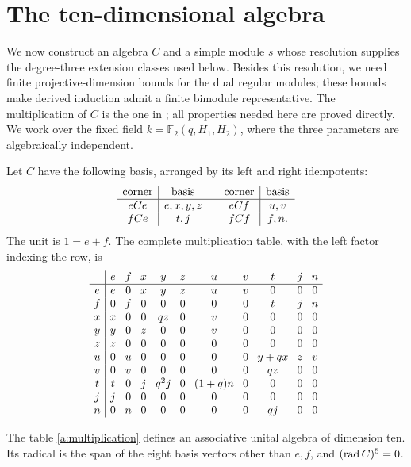 \section{The ten-dimensional algebra}
\label{a:section}

We now construct an algebra \(C\) and a simple module \(s\) whose
resolution supplies the degree-three extension classes used below.
Besides this resolution, we need
finite projective-dimension bounds for the dual regular modules;
these bounds make derived induction admit a finite bimodule
representative. The multiplication of $C$ is the one in
\cite[Section~4.1]{OpenAIAR2026}; all properties needed here are proved
directly.  We work over the fixed field
\(k=\mathbb F_2(q,H_1,H_2)\), where the three parameters are
algebraically independent.

Let \(C\) have the following basis, arranged by its left and right
idempotents:
\begin{equation}
\begin{array}{c|c@{\qquad}c|c}
\text{corner}&\text{basis}&\text{corner}&\text{basis}\\ \hline
eCe&e,x,y,z&eCf&u,v\\
fCe&t,j&fCf&f,n.
\end{array}
\label{a:corners}
\end{equation}
The unit is \(1=e+f\).  The complete multiplication table, with the
left factor indexing the row, is
\begin{equation}
\begingroup
\setlength{\arraycolsep}{4pt}
\begin{array}{c|cccccccccc}
 &e&f&x&y&z&u&v&t&j&n\\ \hline
e&e&0&x&y&z&u&v&0&0&0\\
f&0&f&0&0&0&0&0&t&j&n\\
x&x&0&0&qz&0&v&0&0&0&0\\
y&y&0&z&0&0&v&0&0&0&0\\
z&z&0&0&0&0&0&0&0&0&0\\
u&0&u&0&0&0&0&0&y+qx&z&v\\
v&0&v&0&0&0&0&0&qz&0&0\\
t&t&0&j&q^2j&0&(1+q)n&0&0&0&0\\
j&j&0&0&0&0&0&0&0&0&0\\
n&0&n&0&0&0&0&0&qj&0&0
\end{array}
\endgroup
\label{a:multiplication}
\end{equation}

\begin{lemma}\label{a:table}
The table \eqref{a:multiplication} defines an associative unital algebra
of dimension ten.  Its radical is the span of the eight basis vectors
other than \(e,f\), and \((\operatorname{rad} C)^5=0\).
\end{lemma}

